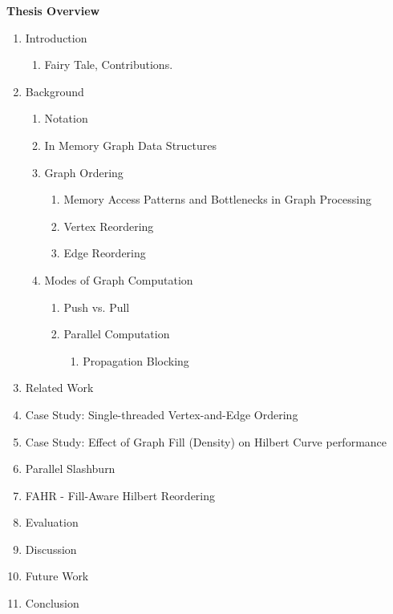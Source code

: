 
\textbf{Thesis Overview}

\begin{enumerate}
    \item{Introduction
    \begin{enumerate}[label*=\arabic*.]
        \item Fairy Tale, Contributions.
    \end{enumerate}
    }

    \item{Background}
    \begin{enumerate}[label*=\arabic*.]
        \item Notation
        \item In Memory Graph Data Structures
        \item{Graph Ordering}
        \begin{enumerate}[label*=\arabic*.]
            \item Memory Access Patterns and Bottlenecks in Graph Processing
            \item Vertex Reordering
            \item Edge Reordering
        \end{enumerate}
        \item{Modes of Graph Computation}
        \begin{enumerate}[label*=\arabic*.]
            \item Push vs. Pull
            \item Parallel Computation
            \begin{enumerate}[label*=\arabic*.]
                \item Propagation Blocking
            \end{enumerate}
    
        \end{enumerate}
    \end{enumerate}

    \item{Related Work}
    
    \item{Case Study: Single-threaded Vertex-and-Edge Ordering}
    \item{Case Study: Effect of Graph Fill (Density) on Hilbert Curve performance}
    
    \item{Parallel Slashburn}
    \item{FAHR - Fill-Aware Hilbert Reordering }
    \item{Evaluation}
    \item{Discussion}
    \item{Future Work}
    \item{Conclusion}


    
        
\end{enumerate}

